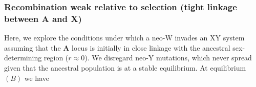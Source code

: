 \documentclass[12pt]{article}
\begin{document}

\subsubsection*{Recombination weak relative to selection (tight linkage between \textbf{A} and \textbf{X})}

Here, we explore the conditions under which a neo-W invades an XY system assuming that the \textbf{A} locus is initially in close linkage with the ancestral sex-determining region ($r \approx 0$). 
We disregard neo-Y mutations, which never spread given that the ancestral population is at a stable equilibrium. 
At equilibrium $(B)$ we have 
\end{document}

